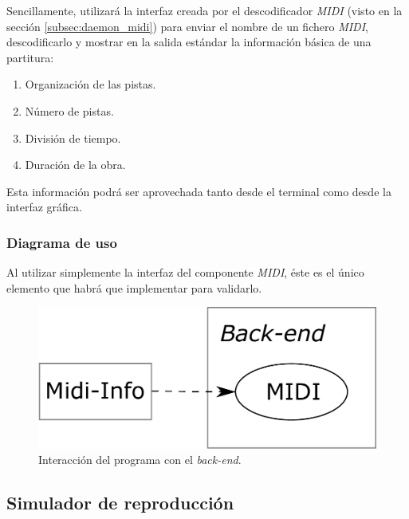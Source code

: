 Sencillamente, utilizará la interfaz creada por el descodificador \textit{MIDI} (visto en la sección \ref{subsec:daemon_midi}) para enviar el nombre de un fichero \textit{MIDI}, descodificarlo y mostrar en la salida estándar la información básica de una partitura:

\begin{enumerate}
	\item Organización de las pistas.
	\item Número de pistas.
	\item División de tiempo.
	\item Duración de la obra.
\end{enumerate}

Esta información podrá ser aprovechada tanto desde el terminal como desde la interfaz gráfica.

\subsubsection{Diagrama de uso}

Al utilizar simplemente la interfaz del componente \textit{MIDI}, éste es el único elemento que habrá que implementar para validarlo.

\smallskip

\begin{figure}[H]
	\noindent \begin{centering}
		\includegraphics[width=\linewidth/3]{capitulo4/midi_info}
		\par\end{centering}
	\smallskip
	\caption{\label{fig:midi_info} Interacción del programa con el \textit{back-end}.}
\end{figure} 

\smallskip

\subsection{Simulador de reproducción}

